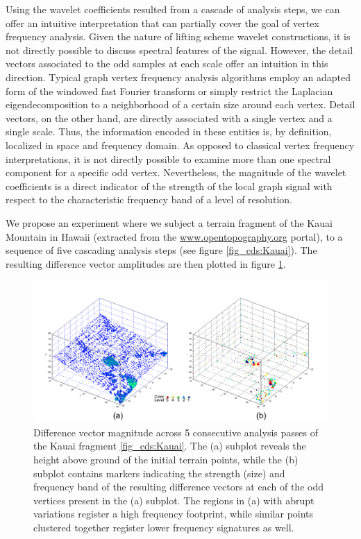 \documentclass[graybox]{svmult}
\begin{document}
	Using the wavelet coefficients resulted from a cascade of analysis steps, we can offer an intuitive interpretation that can partially cover the goal of vertex frequency analysis.
	Given the nature of lifting scheme wavelet constructions, it is not directly possible to discuss spectral features of the signal. However, the detail vectors associated to the odd samples at each scale offer an intuition in this direction. 
	Typical graph vertex frequency analysis algorithms employ an adapted form of the windowed fast Fourier transform or simply restrict the Laplacian eigendecomposition to a neighborhood of a certain size around each vertex. Detail vectors, on the other hand, are directly associated with a single vertex and a single scale. Thus, the information encoded in these entities is, by definition, localized in space and frequency domain. As opposed to classical vertex frequency interpretations, it is not directly possible to examine more than one spectral component for a specific odd vertex. Nevertheless, the magnitude of the wavelet coefficients is a direct indicator of the strength of the local graph signal with respect to the characteristic frequency band of a level of resolution.
	
	We propose an experiment where we subject a terrain fragment of the Kauai Mountain in Hawaii  (extracted from the {\url{www.opentopography.org}} portal), to a sequence of five cascading analysis steps (see figure  \ref{fig_cds:Kauai}). The resulting difference vector amplitudes are then plotted in figure \ref{fig_cds:diff_vector_5}.
	
	\begin{figure}[!htbp]
		\centering
		\includegraphics[width=1\linewidth]{figs/KauaiVFA.pdf}
		\caption{\label{fig_cds:diff_vector_5}
			Difference vector magnitude across 5 consecutive analysis passes of the Kauai fragment \ref{fig_cds:Kauai}. The (a) subplot reveals the height above ground of the initial terrain points, while the (b) subplot contains markers indicating the strength (size) and frequency band of the resulting difference vectors at each of the odd vertices present in the (a) subplot. The regions in (a) with abrupt variations register a high frequency footprint, while similar points clustered together register lower frequency signatures as well. }
	\end{figure}
	
\end{document}
